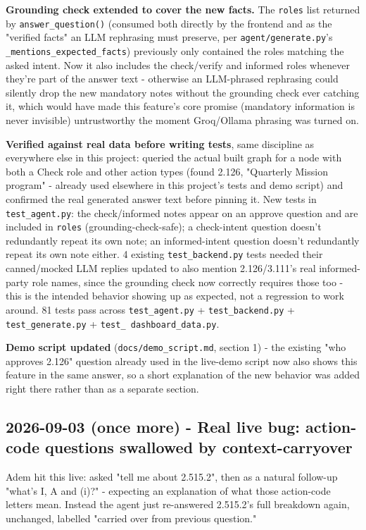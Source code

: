 \textbf{Grounding check extended to cover the new facts.} The \texttt{roles} list returned by \texttt{answer\_\allowbreak{}question()} (consumed both directly by the frontend and as the "verified facts" an LLM rephrasing must preserve, per \texttt{agent/\allowbreak{}generate.py}'s \texttt{\_\allowbreak{}mentions\_\allowbreak{}expected\_\allowbreak{}facts}) previously only contained the roles matching the asked intent. Now it also includes the check/verify and informed roles whenever they're part of the answer text - otherwise an LLM-phrased rephrasing could silently drop the new mandatory notes without the grounding check ever catching it, which would have made this feature's core promise (mandatory information is never invisible) untrustworthy the moment Groq/Ollama phrasing was turned on.

\textbf{Verified against real data before writing tests}, same discipline as everywhere else in this project: queried the actual built graph for a node with both a Check role and other action types (found 2.126, "Quarterly Mission program" - already used elsewhere in this project's tests and demo script) and confirmed the real generated answer text before pinning it. New tests in \texttt{test\_\allowbreak{}agent.py}: the check/informed notes appear on an approve question and are included in \texttt{roles} (grounding-check-safe); a check-intent question doesn't redundantly repeat its own note; an informed-intent question doesn't redundantly repeat its own note either. 4 existing \texttt{test\_\allowbreak{}backend.py} tests needed their canned/mocked LLM replies updated to also mention 2.126/3.111's real informed-party role names, since the grounding check now correctly requires those too - this is the intended behavior showing up as expected, not a regression to work around. 81 tests pass across \texttt{test\_\allowbreak{}agent.py} + \texttt{test\_\allowbreak{}backend.py} + \texttt{test\_\allowbreak{}generate.py} + \texttt{test\_\allowbreak{} dashboard\_\allowbreak{}data.py}.

\textbf{Demo script updated} (\texttt{docs/\allowbreak{}demo\_\allowbreak{}script.md}, section 1) - the existing "who approves 2.126" question already used in the live-demo script now also shows this feature in the same answer, so a short explanation of the new behavior was added right there rather than as a separate section.

\subsection*{2026-09-03 (once more) - Real live bug: action-code questions swallowed by context-carryover}
Adem hit this live: asked "tell me about 2.515.2", then as a natural follow-up "what's I, A and (i)?" - expecting an explanation of what those action-code letters mean. Instead the agent just re-answered 2.515.2's full breakdown again, unchanged, labelled "carried over from previous question."

